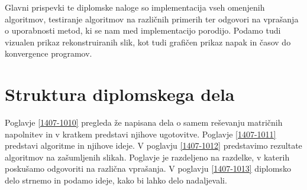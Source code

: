 Glavni prispevki te diplomske naloge so implementacija vseh omenjenih algoritmov, testiranje algoritmov na različnih primerih ter odgovori na vprašanja o uporabnosti metod, ki se nam med implementacijo porodijo. Podamo tudi vizualen prikaz rekonstruiranih slik, kot tudi grafičen prikaz napak in časov do konvergence programov.

\section{Struktura diplomskega dela}

Poglavje \ref{1407-1010} pregleda že napisana dela o samem reševanju matričnih napolnitev in v kratkem predstavi njihove ugotovitve. Poglavje \ref{1407-1011} predstavi algoritme in njihove ideje. V poglavju \ref{1407-1012} predstavimo rezultate algoritmov na zašumljenih slikah. Poglavje je razdeljeno na razdelke, v katerih poskušamo odgovoriti na različna vprašanja. V poglavju \ref{1407-1013} diplomsko delo strnemo in podamo ideje, kako bi lahko delo nadaljevali.